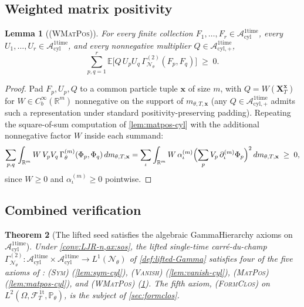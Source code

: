 \documentclass[11pt,reqno]{amsart}
\theoremstyle{plain}
\newtheorem{theorem}{Theorem}[section]
\newtheorem{lemma}[theorem]{Lemma}
\theoremstyle{definition}
\theoremstyle{remark}
\newcommand{\R}{\mathbb R}
\newcommand{\E}{\mathbb E}
\newcommand{\Prob}{\mathbb P}
\newcommand{\cA}{\mathcal A}
\newcommand{\cF}{\mathcal F}
\newcommand{\cN}{\mathcal N}
\newcommand{\Aone}{\cA_{\mathrm{cyl}}^{\mathrm{1time}}}
\newcommand{\Aonep}{\cA_{\mathrm{cyl},+}^{\mathrm{1time}}}
\newcommand{\FT}{\cF_{T}^{\,\mathrm{1t}}}
\newcommand{\Hone}{L^{2}(\Omega,\FT,\Pth)}
\newcommand{\GamN}{\Gamma^{(2)}_{\cN_{\theta}}}
\newcommand{\GamM}[1]{\Gamma^{(#1)}_{\theta}}
\newcommand{\Pth}{\Prob_{\theta}}
\begin{document}
\subsection{Weighted matrix positivity}\label{sec:axioms-wmatpos}

\begin{lemma}[\normalfont\textsc{(WMatPos)}]\label{lem:wmatpos-cyl}
For every finite collection $F_{1},\ldots,F_{r}\in\Aone$, every
$U_{1},\ldots,U_{r}\in\Aone$, and every nonnegative multiplier
$Q\in\Aonep$,
\begin{equation}\label{eq:axwmatpos-cyl}
  \sum_{p,q=1}^{r}\E\bigl[Q\,U_{p}U_{q}\,\GamN(F_{p},F_{q})\bigr]\;\ge\;0.
\end{equation}
\end{lemma}

\begin{proof}
Pad $F_{p},U_{p},Q$ to a common particle tuple $\mathbf x$ of
size $m$, with $Q=W(\mathbf X_{T}^{\mathbf x})$ for
$W\in C_{b}^{\infty}(\R^{m})$ nonnegative on the support of
$m_{\theta,T,\mathbf x}$ (any $Q\in\Aonep$ admits such a
representation under standard positivity-preserving padding).
Repeating the square-of-sum computation of \cref{lem:matpos-cyl}
with the additional nonnegative factor $W$ inside each summand:
\begin{equation*}
  \sum_{p,q}\int_{\R^{m}}W\,V_{p}V_{q}\,\GamM{m}(\Phi_{p},\Phi_{q})\,dm_{\theta,T,\mathbf x}
  =\sum_{\iota}\int_{\R^{m}}W\,\alpha^{(m)}_{\iota}
   \Bigl(\sum_{p}V_{p}\,\partial^{(m)}_{\iota}\Phi_{p}\Bigr)^{2}\,dm_{\theta,T,\mathbf x}\;\ge\;0,
\end{equation*}
since $W\ge 0$ and $\alpha^{(m)}_{\iota}\ge 0$ pointwise.
\end{proof}

\subsection{Combined verification}\label{sec:axioms-summary}

\begin{theorem}[The lifted seed satisfies the algebraic
GammaHierarchy axioms on $\Aone$]\label{thm:axioms}
Under \cref{conv:LJR-n,ax:sos}, the lifted single-time
carr\'e-du-champ
$\GamN\colon\Aone\times\Aone\to L^{1}(\cN_{\theta})$ of
\cref{def:lifted-Gamma} satisfies four of the five axioms of
\cite[Ass.~2.4]{GammaHierarchyDivergence}:
{\normalfont\textsc{(Sym)}} (\cref{lem:sym-cyl}),
{\normalfont\textsc{(Vanish)}} (\cref{lem:vanish-cyl}),
{\normalfont\textsc{(MatPos)}} (\cref{lem:matpos-cyl}), and
{\normalfont\textsc{(WMatPos)}} (\cref{lem:wmatpos-cyl}). The fifth
axiom, {\normalfont\textsc{(FormClos)}} on $\Hone$, is the subject
of \cref{sec:formclos}.
\end{theorem}
\end{document}
